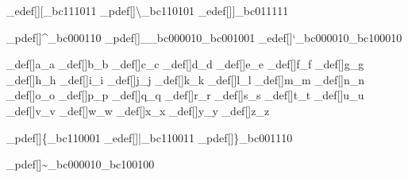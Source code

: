 \brl@char_edef[]{[}{\brl@char_bc111011}
\brl@char_pdef[]{\textbackslash}{\brl@char_bc110101}%
\brl@char_edef[]{]}{\brl@char_bc011111}

\brl@char_pdef[]{\textasciicircum}{\brl@char_bc000110}%
\brl@char_pdef[]{\_}{\brl@char_bc000010\brl@char_bc001001}
\brl@char_edef[]{`}{\brl@char_bc000010\brl@char_bc100010}

\brl@char_def[]{a}{\brl@char@alias_a}
\brl@char_def[]{b}{\brl@char@alias_b}
\brl@char_def[]{c}{\brl@char@alias_c}
\brl@char_def[]{d}{\brl@char@alias_d}
\brl@char_def[]{e}{\brl@char@alias_e}
\brl@char_def[]{f}{\brl@char@alias_f}
\brl@char_def[]{g}{\brl@char@alias_g}
\brl@char_def[]{h}{\brl@char@alias_h}
\brl@char_def[]{i}{\brl@char@alias_i}
\brl@char_def[]{j}{\brl@char@alias_j}
\brl@char_def[]{k}{\brl@char@alias_k}
\brl@char_def[]{l}{\brl@char@alias_l}
\brl@char_def[]{m}{\brl@char@alias_m}
\brl@char_def[]{n}{\brl@char@alias_n}
\brl@char_def[]{o}{\brl@char@alias_o}
\brl@char_def[]{p}{\brl@char@alias_p}
\brl@char_def[]{q}{\brl@char@alias_q}
\brl@char_def[]{r}{\brl@char@alias_r}
\brl@char_def[]{s}{\brl@char@alias_s}
\brl@char_def[]{t}{\brl@char@alias_t}
\brl@char_def[]{u}{\brl@char@alias_u}
\brl@char_def[]{v}{\brl@char@alias_v}
\brl@char_def[]{w}{\brl@char@alias_w}
\brl@char_def[]{x}{\brl@char@alias_x}
\brl@char_def[]{y}{\brl@char@alias_y}
\brl@char_def[]{z}{\brl@char@alias_z}

\brl@char_pdef[]{\{}{\brl@char_bc110001}
\brl@char_edef[]{|}{\brl@char_bc110011}
\brl@char_pdef[]{\}}{\brl@char_bc001110}

\brl@char_pdef[]{\textasciitilde}{\brl@char_bc000010\brl@char_bc100100}



